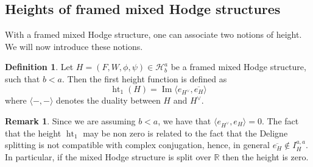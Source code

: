 \documentclass[11pt,a4paper]{amsart}
\newcommand{\R}{\mathds{R}}
\newcommand{\caH}{\mathcal{H}}
\DeclareMathOperator{\im}{Im}
\DeclareMathOperator{\Ht}{ht}
\numberwithin{equation}{section}
\theoremstyle{plain}
\theoremstyle{definition}
\newtheorem{df}[prop]{Definition}
\newtheorem{rmk}[prop]{Remark}
\begin{document}
\subsection{Heights of framed mixed Hodge structures}
\label{sec:heights-framed-mixed}
With a framed mixed Hodge structure, one can associate two notions of
height. We will now introduce these notions.

\begin{df}\label{height-framed}
Let $H=(F,W, \phi,\psi)\in \caH^{a}_{b}$ be a framed mixed Hodge
structure, such that $b< a$.
Then the first height function is defined as 
\begin{equation}\label{eq:18}
  \Ht_{1}(H)=\im\langle e_{H^{\vee}}, \overline {e_{H}}\rangle
\end{equation}
where $\langle -,-\rangle $ denotes the duality between $H$ and
$H^{\vee}$. 
\end{df}

\begin{rmk}
  Since we are assuming $b<a$, we have that $\langle
  e_{H^{\vee}},e_{H}\rangle =0$. The fact that the height $\Ht_{1}$
  may be non zero is related to the fact that the Deligne splitting is
  not compatible with complex conjugation, hence, in general
  $\overline{e_{H}}\not \in I^{a,a}_{H}$. In particular, if the mixed
  Hodge structure is split over $\R$ then the height is zero.  
\end{rmk}
\end{document}
